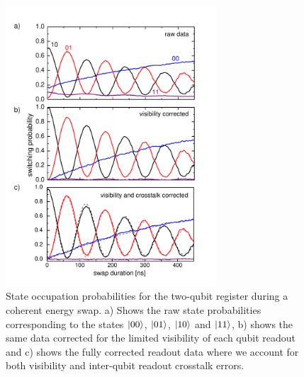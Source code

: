 \begin{figure}[ht!]
	\centering
	\includegraphics[width=0.7\textwidth]{"./material/papers/iswap/figures/swap_raw_and_corrected"}
	\caption[]{State occupation probabilities for the two-qubit register during a coherent energy swap. a) Shows the raw state probabilities corresponding to the states $\left| 00 \right>$, $\left| 01 \right>$, $\left| 10 \right>$ and $\left| 11 \right>$, b) shows the same data corrected for the limited visibility of each qubit readout and c) shows the fully corrected readout data where we account for both visibility and inter-qubit readout crosstalk errors.}
	\label{fig:swap_raw_and_corrected}
\end{figure}

